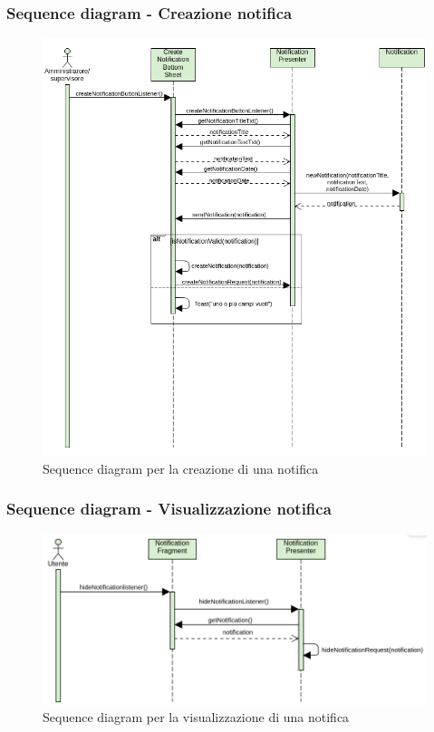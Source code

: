 \subsubsection{Sequence diagram - Creazione notifica}
\begin{figure}[H]
  \centering
  \includegraphics[scale=0.6]{img/sequence_diagram_design/creazioneNotifica.png}
  \caption{Sequence diagram per la creazione di una notifica}
\end{figure}
\newpage

\subsubsection{Sequence diagram - Visualizzazione notifica}
\begin{figure}[H]
  \centering
  \includegraphics[scale=0.6]{img/sequence_diagram_design/hideNotification.png}
  \caption{Sequence diagram per la visualizzazione di una notifica}
\end{figure}
\newpage